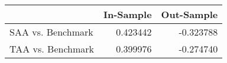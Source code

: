 \begin{tabular}{lrr}
\toprule
{} &  In-Sample &  Out-Sample \\
\midrule
SAA vs. Benchmark &   0.423442 &   -0.323788 \\
TAA vs. Benchmark &   0.399976 &   -0.274740 \\
\bottomrule
\end{tabular}
